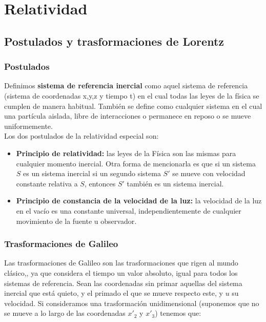 \documentclass[12pt,a4paper]{book}
\begin{document}
\chapter{Relatividad}

\section{Postulados y trasformaciones de Lorentz}

\subsection{Postulados}

Definimos \textbf{sistema de referencia inercial} como aquel sistema de referencia (sistema de coordenadas x,y,z y tiempo t) en el cual todas las leyes de la física se cumplen de manera habitual. También se define como cualquier sistema en el cual una partícula aislada, libre de interacciones o permanece en reposo o se mueve uniformemente.\\



Los dos postulados de la relatividad especial son:

\begin{itemize}
\item \textbf{Principio de relatividad:} las leyes de la Física son las mismas para cualquier momento inercial. Otra forma de mencionarla es que si un sistema $S$ es un sistema inercial si un segundo sistema $S'$ se mueve con velocidad constante relativa a $S$, entonces $S'$ también es un sistema inercial.

\item \textbf{Principio de constancia de la velocidad de la luz:} la velocidad de la luz en el vacío es una constante universal, independientemente de cualquier movimiento de la fuente u observador.
\end{itemize}


\subsection{Trasformaciones de Galileo}

Las trasformaciones de Galileo son las trasformaciones que rigen al mundo clásico,, ya que considera el tiempo un valor absoluto, igual para todos los sistemas de referencia.  Sean las coordenadas sin primar aquellas del sistema inercial que está quieto, y el primado el que se mueve respecto este, y $u$ su velocidad. Si consideramos una trasformación unidimensional (suponemos que no se mueve a lo largo de las coordenadas $x'_2$ y $x'_3$) tenemos que:
\end{document}
